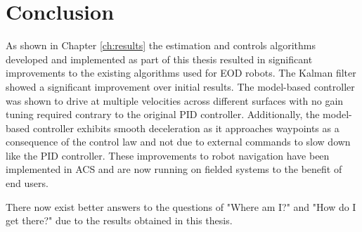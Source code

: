 \chapter{Conclusion}
\label{ch:conclusion}
As shown in Chapter \ref{ch:results} the estimation and controls algorithms developed and implemented as part of this thesis resulted in significant improvements to the existing algorithms used for EOD robots. The Kalman filter showed a significant improvement over initial results. The model-based controller was shown to drive at multiple velocities across different surfaces with no gain tuning required contrary to the original PID controller. Additionally, the model-based controller exhibits smooth deceleration as it approaches waypoints as a consequence of the control law and not due to external commands to slow down like the PID controller. These improvements to robot navigation have been implemented in ACS and are now running on fielded systems to the benefit of end users.

There now exist better answers to the questions of "Where am I?" and "How do I get there?" due to the results obtained in this thesis.
